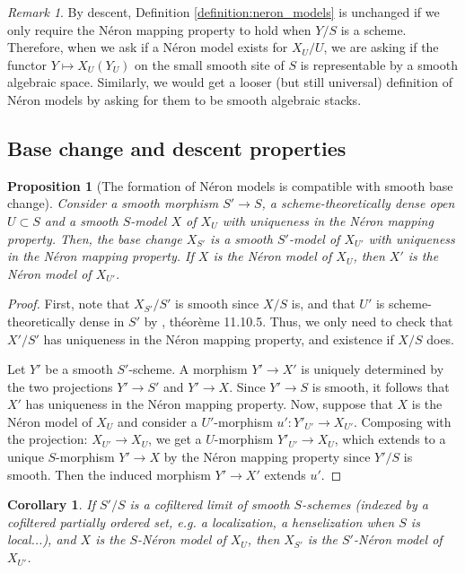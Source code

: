 \documentclass[a4paper,10pt,twoside]{article}
\newcommand{\ra}{\rightarrow}
\newtheorem{cor}[thm]{Corollary}
\newtheorem{prop}[thm]{Proposition}
\theoremstyle{definition}
\theoremstyle{remark}
\newtheorem{rem}{Remark}[thm]
\begin{document}
\begin{rem}\label{remark:NMs_represent_the_restriction_functor_on_small_smooth_site}
By descent, Definition \ref{definition:neron_models} is unchanged if we only require the Néron mapping property to hold when $Y/S$ is a scheme. Therefore, when we ask if a Néron model exists for $X_U/U$, we are asking if the functor $Y \mapsto X_U(Y_U)$ on the small smooth site of $S$ is representable by a smooth algebraic space. Similarly, we would get a looser (but still universal) definition of Néron models by asking for them to be smooth algebraic stacks.
\end{rem}

\subsection{Base change and descent properties}




\begin{prop}[The formation of Néron models is compatible with smooth base change]\label{changement de base lisse}
Consider a smooth morphism $S'\ra S$, a scheme-theoretically dense open $U\subset S$ and a smooth $S$-model $X$ of $X_U$ with uniqueness in the Néron mapping property. Then, the base change $X_{S'}$ is a smooth $S'$-model of $X_{U'}$ with uniqueness in the Néron mapping property. If $X$ is the Néron model of $X_U$, then $X'$ is the Néron model of $X_{U'}$.
\end{prop}

\begin{proof}
	First, note that $X_{S'}/S'$ is smooth since $X/S$ is, and that $U'$ is scheme-theoretically dense in $S'$ by \cite{EGA4.3}, théorème 11.10.5. Thus, we only need to check that $X'/S'$ has uniqueness in the Néron mapping property, and existence if $X/S$ does.

	Let $Y'$ be a smooth $S'$-scheme. A morphism $Y' \to X'$ is uniquely determined by the two projections $Y' \to S'$ and $Y' \to X$. Since $Y' \to S$ is smooth, it follows that $X'$ has uniqueness in the Néron mapping property. Now, suppose that $X$ is the Néron model of $X_U$ and consider a $U'$-morphism $u': Y'_{U'}\ra X_{U'}$. Composing with the projection: $X_{U'}\ra X_U$, we get a $U$-morphism $Y'_{U'}\ra X_U$, which extends to a unique $S$-morphism $Y'\ra X$ by the Néron mapping property since $Y'/S$ is smooth. Then the induced morphism $Y'\ra X'$ extends $u'$.
\end{proof}

\begin{cor}\label{corollaire le NM passe aux limites d'algebres lisses}
	If $S'/S$ is a cofiltered limit of smooth $S$-schemes (indexed by a cofiltered partially ordered set, e.g. a localization, a henselization when $S$ is local...), and $X$ is the $S$-Néron model of $X_U$, then $X_{S'}$ is the $S'$-Néron model of $X_{U'}$.
\end{cor}
\end{document}
